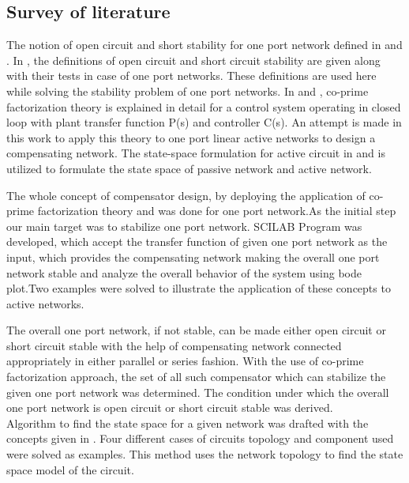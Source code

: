 \subsection{Survey of literature}
The notion of open circuit and short stability for one port network defined in \cite{Haykin} and \cite{Chua}. In \cite{Chua}, the definitions of open circuit and short circuit stability are given along with their tests in case of one port networks.  These definitions are used here while solving the stability problem of one port networks. In \cite{Doyle} \cite{Vidya} and \cite{Deoser}, co-prime factorization theory is explained in detail for a control system operating in closed loop with plant transfer function P(s) and controller C(s). An attempt is made in this work to apply this theory to one port linear active networks to design a compensating network.  The state-space formulation for active circuit in \cite{anderson2006network} \cite{Tomas} and is utilized to formulate the state space of passive network and active network.

The whole concept of compensator design, by deploying the application of co-prime factorization theory \cite{Doyle} \cite{Vidya} and \cite{Deoser} was done for one port network.As the initial step our main target was to stabilize one port network. SCILAB Program was developed, which accept the transfer function of given one port network as the input, which provides the compensating network making the overall one port network stable and analyze the overall behavior of the system using bode plot.Two examples were solved to illustrate the application of these concepts to active networks. 

The overall one port network, if not stable, can be made either open circuit or short circuit stable with the help of compensating network connected appropriately in either parallel or series fashion. With the use of co-prime factorization approach, the set of all such compensator which can stabilize the given one port network was determined. The condition under which the overall one port network is open circuit or short circuit stable was derived.\\

Algorithm to find the state space for a given network was drafted with the concepts given in \cite{anderson2006network}. Four different cases of circuits topology and component used were solved as examples. This method uses the network topology to find the state space model of the circuit.

